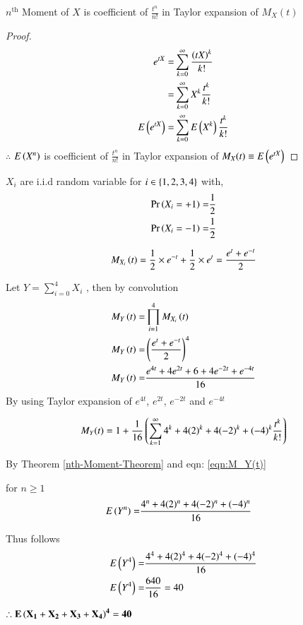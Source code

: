 \documentclass[journal,12pt,twocolumn]{IEEEtran}
\begin{document}
\begin{theorem}
$n^{\text{th}}$ Moment of $X$  is coefficient of $\frac{t^n}{n!}$ in Taylor expansion of $M_X(t)$
\label{nth-Moment-Theorem}
\end{theorem}

\begin{proof}
\begin{align}
    e^{t X}=&\sum_{k=0}^{\infty} \frac{\left(tX\right)^k}{k!}
    \\=&\sum_{k=0}^{\infty}X^k \frac{{t}^k}{k!}
    \\E\left(e^{t X}\right)=&\sum_{k=0}^{\infty}E\left(X^k\right) \frac{{t}^k}{k!}
\end{align}
$\therefore$ $E\left(X^n\right)$ is coefficient of $\frac{{t}^n}{n!}$ in Taylor expansion of $M_X(t) \equiv E\left(e^{t X}\right)$  
\end{proof}

$X_i$ are i.i.d random variable for $i \in \left\{1,2,3,4\right\} $ 
with,
\begin{align}
    \Pr\left(X_i=+1\right)=&\frac{1}{2}
    \\\Pr\left(X_i=-1\right)=&\frac{1}{2}
\end{align}

\begin{lemma}
\begin{align}
    M_{X_i}\left(t\right)=\frac{1}{2}\times e^{-t} + \frac{1}{2} \times e^{t}=\frac{e^{t}+e^{-t}}{2}
\end{align}
\end{lemma}

Let $Y=\sum_{i=0}^{4}X_i$ , then by convolution
\begin{align}
    M_{Y}\left(t\right)=& \prod_{i=1}^{4} M_{X_i}\left(t\right) 
    \\M_{Y}\left(t\right) =& \left(\frac{e^{t}+e^{-t}}{2}\right)^4
    \\M_{Y}\left(t\right) =& \frac{e^{4t}+4e^{2t}+6+4e^{-2t}+e^{-4t}}{16}
\end{align}
By using Taylor expansion of $e^{4t}$, $e^{2t}$, $e^{-2t}$ and $e^{-4t}$

\begin{corollary}
\begin{align}
    M_Y(t)=1+ \frac{1}{16}\left( \sum_{k=1}^{\infty} 4^k+4(2)^k+4(-2)^k+(-4)^k\frac{t^k}{k!} \right)
    \label{eqn:M_Y(t)}
\end{align}
\end{corollary}

By Theorem \ref{nth-Moment-Theorem} and eqn: \eqref{eqn:M_Y(t)}
\begin{theorem}
for $n \geq 1$
\begin{align}
    E\left(Y^n\right)=&\frac{4^n+4(2)^n+4(-2)^n+(-4)^n}{16} 
\end{align}
\label{exp_yn}
\end{theorem}

Thus follows
\begin{align}
    E\left(Y^4\right)=&\frac{4^4+4(2)^4+4(-2)^4+(-4)^4}{16} 
    \\E\left(Y^4\right)=&\frac{640}{16}=40
\end{align}

{\centering
$\mathbf{\therefore E\left(X_1+X_2 +X_3 +X_4\right)^4=40}$

}
\end{document}
